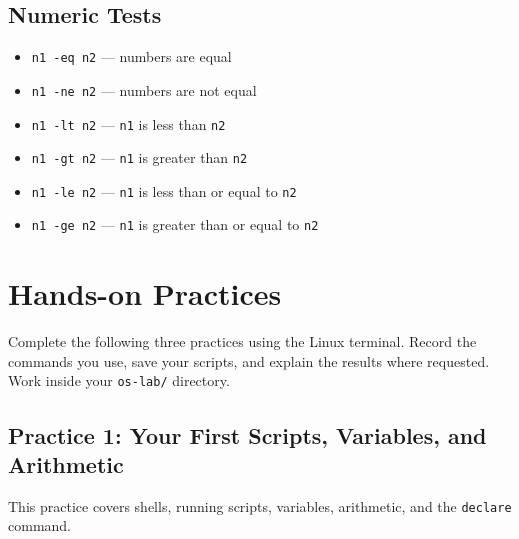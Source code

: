 \subsection{Numeric Tests}
\begin{itemize}
    \item \texttt{n1 -eq n2} --- numbers are equal
    \item \texttt{n1 -ne n2} --- numbers are not equal
    \item \texttt{n1 -lt n2} --- \texttt{n1} is less than \texttt{n2}
    \item \texttt{n1 -gt n2} --- \texttt{n1} is greater than \texttt{n2}
    \item \texttt{n1 -le n2} --- \texttt{n1} is less than or equal to \texttt{n2}
    \item \texttt{n1 -ge n2} --- \texttt{n1} is greater than or equal to \texttt{n2}
\end{itemize}


\section{Hands-on Practices}
Complete the following three practices using the Linux terminal. Record the commands you use, save your scripts, and explain the results where requested. Work inside your \texttt{os-lab/} directory.

\subsection{Practice 1: Your First Scripts, Variables, and Arithmetic}
This practice covers shells, running scripts, variables, arithmetic, and the \texttt{declare} command.

